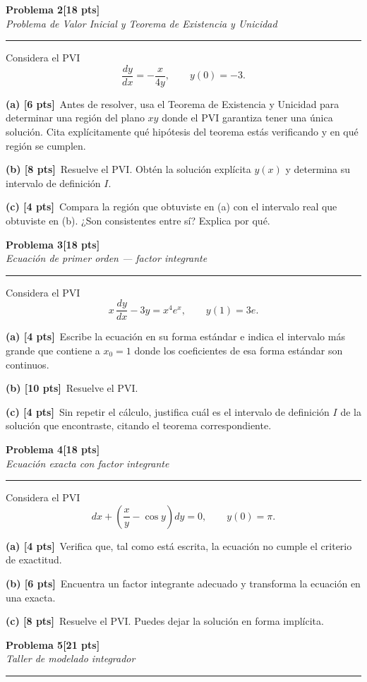 \documentclass[11pt,letterpaper]{article}
\newcommand{\problema}[3]{%
  \bigskip\bigskip\noindent
  {\Large\textbf{Problema #1}}\hfill\textbf{[#2 pts]}\\[3pt]
  {\small\itshape #3}\par
  \vspace{2pt}\hrule\vspace{8pt}
}
\newcommand{\subparte}[2]{%
  \medskip\noindent\textbf{(#1}\ #2\par
}
\begin{document}
\problema{2}{18}{Problema de Valor Inicial y Teorema de Existencia y Unicidad}

Considera el PVI
\[
\frac{dy}{dx} = -\frac{x}{4y}, \qquad y(0) = -3.
\]

\subparte{a) [6 pts]}{Antes de resolver, usa el Teorema de Existencia y Unicidad para determinar una región del plano $xy$ donde el PVI garantiza tener una única solución. Cita explícitamente qué hipótesis del teorema estás verificando y en qué región se cumplen.}

\subparte{b) [8 pts]}{Resuelve el PVI. Obtén la solución explícita $y(x)$ y determina su intervalo de definición $I$.}

\subparte{c) [4 pts]}{Compara la región que obtuviste en (a) con el intervalo real que obtuviste en (b). ¿Son consistentes entre sí? Explica por qué.}


\problema{3}{18}{Ecuación de primer orden — factor integrante}

Considera el PVI
\[
x\,\frac{dy}{dx} - 3y = x^4 e^x, \qquad y(1) = 3e.
\]

\subparte{a) [4 pts]}{Escribe la ecuación en su forma estándar e indica el intervalo más grande que contiene a $x_0=1$ donde los coeficientes de esa forma estándar son continuos.}

\subparte{b) [10 pts]}{Resuelve el PVI.}

\subparte{c) [4 pts]}{Sin repetir el cálculo, justifica cuál es el intervalo de definición $I$ de la solución que encontraste, citando el teorema correspondiente.}

\problema{4}{18}{Ecuación exacta con factor integrante}

Considera el PVI
\[
dx + \left(\frac{x}{y} - \cos y\right) dy = 0, \qquad y(0) = \pi.
\]

\subparte{a) [4 pts]}{Verifica que, tal como está escrita, la ecuación no cumple el criterio de exactitud.}

\subparte{b) [6 pts]}{Encuentra un factor integrante adecuado y transforma la ecuación en una exacta.}

\subparte{c) [8 pts]}{Resuelve el PVI. Puedes dejar la solución en forma implícita.}


\problema{5}{21}{Taller de modelado integrador}
\end{document}
